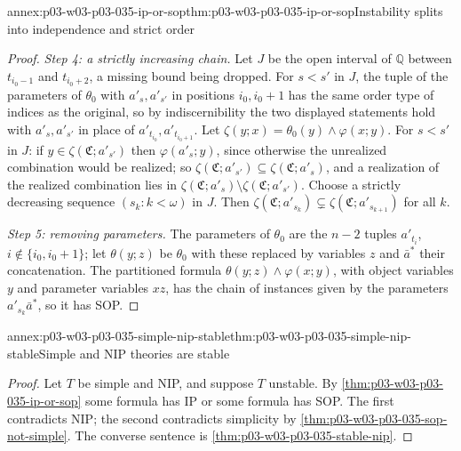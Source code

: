 \begin{annexitem}{annex:p03-w03-p03-035-ip-or-sop}{thm:p03-w03-p03-035-ip-or-sop}{Instability splits into independence and strict order}
\begin{proof}
\emph{Step 4: a strictly increasing chain.}  Let \(J\) be the open interval of
\(\mathbb Q\) between \(t_{i_0-1}\) and \(t_{i_0+2}\), a missing bound being
dropped.  For \(s<s'\) in \(J\), the tuple of the parameters of \(\theta_0\)
with \(a'_s,a'_{s'}\) in positions \(i_0,i_0+1\) has the same order type of
indices as the original, so by indiscernibility the two displayed statements
hold with \(a'_s,a'_{s'}\) in place of \(a'_{t_{i_0}},a'_{t_{i_0+1}}\).  Let
\(\zeta(y;x)=\theta_0(y)\wedge\varphi(x;y)\).  For \(s<s'\) in \(J\): if
\(y\in\zeta(\mathfrak C;a'_{s'})\) then \(\varphi(a'_s;y)\), since otherwise
the unrealized combination would be realized; so
\(\zeta(\mathfrak C;a'_{s'})\subseteq\zeta(\mathfrak C;a'_s)\), and a
realization of the realized combination lies in
\(\zeta(\mathfrak C;a'_s)\setminus\zeta(\mathfrak C;a'_{s'})\).  Choose a
strictly decreasing sequence \((s_k:k<\omega)\) in \(J\).  Then
\(\zeta(\mathfrak C;a'_{s_k})\subsetneq\zeta(\mathfrak C;a'_{s_{k+1}})\) for
all \(k\).

\emph{Step 5: removing parameters.}  The parameters of \(\theta_0\) are the
\(n-2\) tuples \(a'_{t_i}\), \(i\notin\{i_0,i_0+1\}\); let \(\theta(y;z)\) be
\(\theta_0\) with these replaced by variables \(z\) and \(\bar a^*\) their
concatenation.  The partitioned formula
\(\theta(y;z)\wedge\varphi(x;y)\), with object variables \(y\) and parameter
variables \(xz\), has the chain of instances given by the parameters
\(a'_{s_k}\bar a^*\), so it has SOP.
\end{proof}
\end{annexitem}

\begin{annexitem}{annex:p03-w03-p03-035-simple-nip-stable}{thm:p03-w03-p03-035-simple-nip-stable}{Simple and NIP theories are stable}
\begin{proof}
Let \(T\) be simple and NIP, and suppose \(T\) unstable.  By
\cref{thm:p03-w03-p03-035-ip-or-sop} some formula has IP or some formula has
SOP.  The first contradicts NIP; the second contradicts simplicity by
\cref{thm:p03-w03-p03-035-sop-not-simple}.  The converse sentence is
\cref{thm:p03-w03-p03-035-stable-nip}.
\end{proof}
\end{annexitem}

